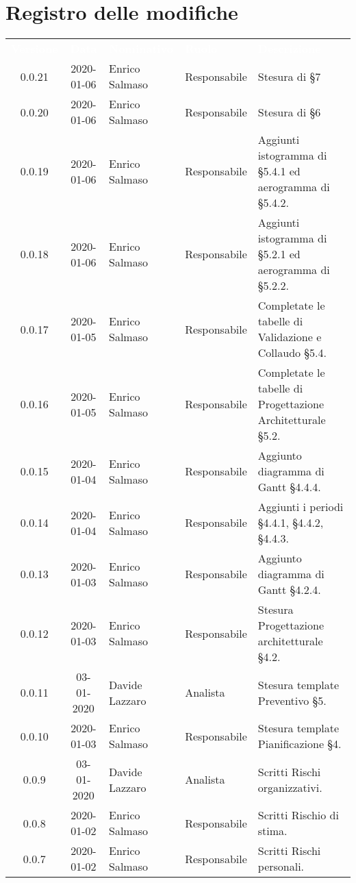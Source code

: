 \section*{Registro delle modifiche}
{
\renewcommand{\arraystretch}{1.5}
\centering
\begin{longtable}{ c c  C{4cm}  C{3cm} C{4cm}}
\textcolor{white}{\textbf{Versione}} & \textcolor{white}{\textbf{Data}} & \textcolor{white}{\textbf{Nominativo}} & \textcolor{white}{\textbf{Ruolo}} & \textcolor{white}{\textbf{Descrizione}}\\	


0.0.21 & 2020-01-06 & Enrico Salmaso & Responsabile & Stesura di §7\\
0.0.20 & 2020-01-06 & Enrico Salmaso & Responsabile & Stesura di §6\\
0.0.19 & 2020-01-06 & Enrico Salmaso & Responsabile & Aggiunti istogramma di §5.4.1 ed aerogramma di §5.4.2.\\
0.0.18 & 2020-01-06 & Enrico Salmaso & Responsabile & Aggiunti istogramma di §5.2.1 ed aerogramma di §5.2.2.\\
0.0.17 & 2020-01-05 & Enrico Salmaso & Responsabile & Completate le tabelle di Validazione e Collaudo §5.4.\\
0.0.16 & 2020-01-05 & Enrico Salmaso & Responsabile & Completate le tabelle di Progettazione Architetturale §5.2.\\
0.0.15 & 2020-01-04 & Enrico Salmaso & Responsabile & Aggiunto diagramma di Gantt §4.4.4. \\
0.0.14 & 2020-01-04 & Enrico Salmaso & Responsabile & Aggiunti i periodi §4.4.1, §4.4.2, §4.4.3.\\
0.0.13 & 2020-01-03 & Enrico Salmaso & Responsabile & Aggiunto diagramma di Gantt §4.2.4.\\
0.0.12 & 2020-01-03 & Enrico Salmaso & Responsabile & Stesura Progettazione architetturale §4.2.\\
0.0.11 & 03-01-2020 & Davide Lazzaro & Analista & Stesura template Preventivo §5.\\
0.0.10 & 2020-01-03 &  Enrico Salmaso & Responsabile & Stesura template Pianificazione §4.\\
0.0.9 & 03-01-2020 & Davide Lazzaro & Analista & Scritti Rischi organizzativi. \\
0.0.8 & 2020-01-02 &  Enrico Salmaso & Responsabile & Scritti Rischio di stima. \\
0.0.7 & 2020-01-02 & Enrico Salmaso & Responsabile & Scritti Rischi personali. \\

\end{longtable}}
